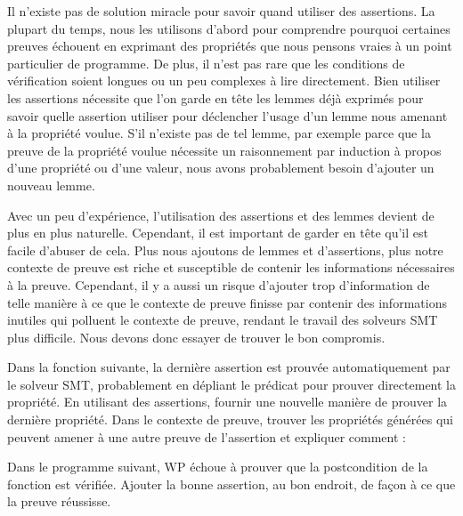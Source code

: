 Il n'existe pas de solution miracle pour savoir quand utiliser des assertions.
La plupart du temps, nous les utilisons d'abord pour comprendre pourquoi certaines
preuves échouent en exprimant des propriétés que nous pensons vraies
à un point particulier de programme. De plus, il n'est pas rare que les conditions
de vérification soient longues ou un peu complexes à lire directement. Bien
utiliser les assertions nécessite que l'on garde en tête les lemmes déjà exprimés
pour savoir quelle assertion utiliser pour déclencher l'usage d'un lemme nous
amenant à la propriété voulue. S'il n'existe pas de tel lemme, par exemple parce
que la preuve de la propriété voulue nécessite un raisonnement par induction à
propos d'une propriété ou d'une valeur, nous avons probablement besoin d'ajouter
un nouveau lemme.


Avec un peu d'expérience, l'utilisation des assertions et des lemmes devient de
plus en plus naturelle. Cependant, il est important de garder en tête qu'il est
facile d'abuser de cela. Plus nous ajoutons de lemmes et d'assertions, plus notre
contexte de preuve est riche et susceptible de contenir les informations
nécessaires à la preuve. Cependant, il y a aussi un risque d'ajouter trop
d'information de telle manière à ce que le contexte de preuve finisse par contenir
des informations inutiles qui polluent le contexte de preuve, rendant le travail
des solveurs SMT plus difficile. Nous devons donc essayer de trouver le bon
compromis.






Dans la fonction suivante, la dernière assertion est prouvée automatiquement
par le solveur SMT, probablement en dépliant le prédicat pour prouver
directement la propriété. En utilisant des assertions, fournir une nouvelle
manière de prouver la dernière propriété. Dans le contexte de preuve, trouver
les propriétés générées qui peuvent amener à une autre preuve de l'assertion
et expliquer comment :








Dans le programme suivant, WP échoue à prouver que la postcondition de la
fonction  est vérifiée. Ajouter la bonne assertion, au bon endroit,
de façon à ce que la preuve réussisse.


